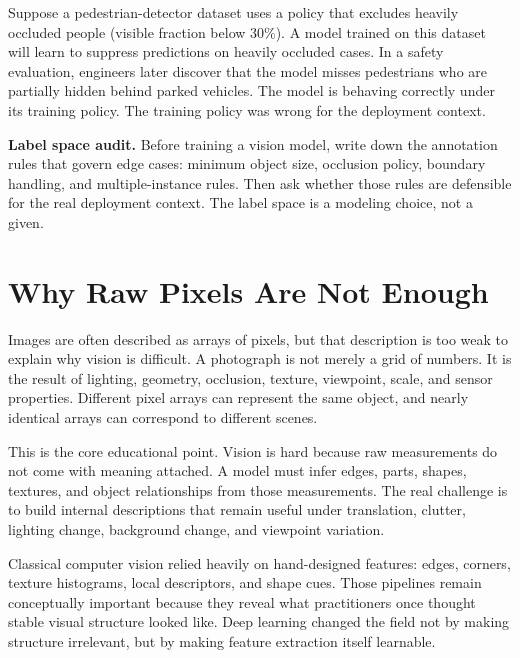 \begin{example}
Suppose a pedestrian-detector dataset uses a policy that excludes heavily occluded people (visible fraction below 30\%). A model trained on this dataset will learn to suppress predictions on heavily occluded cases. In a safety evaluation, engineers later discover that the model misses pedestrians who are partially hidden behind parked vehicles. The model is behaving correctly under its training policy. The training policy was wrong for the deployment context.
\end{example}

\begin{thinkingtool}
\textbf{Label space audit.} Before training a vision model, write down the annotation rules that govern edge cases: minimum object size, occlusion policy, boundary handling, and multiple-instance rules. Then ask whether those rules are defensible for the real deployment context. The label space is a modeling choice, not a given.
\end{thinkingtool}

\section{Why Raw Pixels Are Not Enough}

Images are often described as arrays of pixels, but that description is too weak to explain why vision is difficult. A photograph is not merely a grid of numbers. It is the result of lighting, geometry, occlusion, texture, viewpoint, scale, and sensor properties. Different pixel arrays can represent the same object, and nearly identical arrays can correspond to different scenes.

This is the core educational point. Vision is hard because raw measurements do not come with meaning attached. A model must infer edges, parts, shapes, textures, and object relationships from those measurements. The real challenge is to build internal descriptions that remain useful under translation, clutter, lighting change, background change, and viewpoint variation.

Classical computer vision relied heavily on hand-designed features: edges, corners, texture histograms, local descriptors, and shape cues. Those pipelines remain conceptually important because they reveal what practitioners once thought stable visual structure looked like. Deep learning changed the field not by making structure irrelevant, but by making feature extraction itself learnable.

